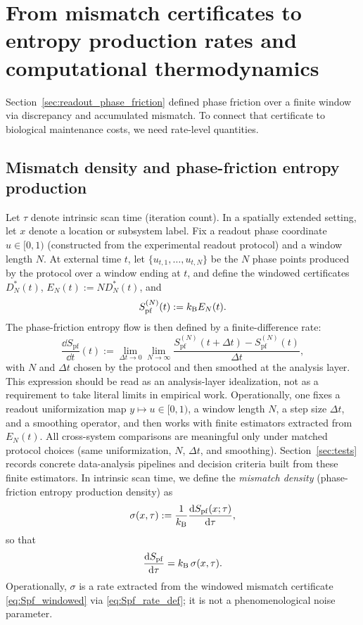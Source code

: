 \section{From mismatch certificates to entropy production rates and computational thermodynamics}
\label{sec:phase_friction_dynamics}

Section~\ref{sec:readout_phase_friction} defined phase friction over a finite window via discrepancy and accumulated mismatch.
To connect that certificate to biological maintenance costs, we need rate-level quantities.

\subsection{Mismatch density and phase-friction entropy production}
\label{sec:mismatch_density}

Let $\tau$ denote intrinsic scan time (iteration count). In a spatially extended setting, let $x$ denote a location or subsystem label.
Fix a readout phase coordinate $u\in[0,1)$ (constructed from the experimental readout protocol) and a window length $N$.
At external time $t$, let $\{u_{t,1},\dots,u_{t,N}\}$ be the $N$ phase points produced by the protocol over a window ending at $t$, and define the windowed certificates $D_N^\ast(t)$, $E_N(t):=N D_N^\ast(t)$, and
\begin{equation}
  S_{\mathrm{pf}}^{(N)}(t) := k_{\mathrm{B}} E_N(t).
  \label{eq:Spf_windowed}
\end{equation}
The phase-friction entropy flow is then defined by a finite-difference rate:
\begin{equation}
  \frac{\dd S_{\mathrm{pf}}}{\dd t}(t)
  := \lim_{\Delta t\to 0}\lim_{N\to\infty} \frac{S_{\mathrm{pf}}^{(N)}(t+\Delta t)-S_{\mathrm{pf}}^{(N)}(t)}{\Delta t},
  \label{eq:Spf_rate_def}
\end{equation}
with $N$ and $\Delta t$ chosen by the protocol and then smoothed at the analysis layer.
This expression should be read as an analysis-layer idealization, not as a requirement to take literal limits in empirical work.
Operationally, one fixes a readout uniformization map $y\mapsto u\in[0,1)$, a window length $N$, a step size $\Delta t$, and a smoothing operator, and then works with finite estimators extracted from $E_N(t)$.
All cross-system comparisons are meaningful only under matched protocol choices (same uniformization, $N$, $\Delta t$, and smoothing).
Section~\ref{sec:tests} records concrete data-analysis pipelines and decision criteria built from these finite estimators.
In intrinsic scan time, we define the \emph{mismatch density} (phase-friction entropy production density) as
\begin{equation}
  \sigma(x,\tau)
  := \frac{1}{k_{\mathrm{B}}}\frac{\mathrm{d} S_{\mathrm{pf}}(x;\tau)}{\mathrm{d} \tau},
  \label{eq:sigma_def}
\end{equation}
so that
\begin{equation}
  \frac{\mathrm{d} S_{\mathrm{pf}}}{\mathrm{d}\tau} = k_{\mathrm{B}}\,\sigma(x,\tau).
  \label{eq:Spf_rate_tau}
\end{equation}
Operationally, $\sigma$ is a rate extracted from the windowed mismatch certificate \eqref{eq:Spf_windowed} via \eqref{eq:Spf_rate_def}; it is not a phenomenological noise parameter.

